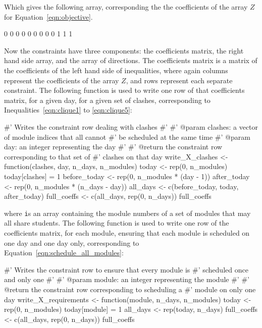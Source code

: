 Which gives the following array, corresponding the the coefficients of the array $Z$ for Equation~\ref{eqn:objective}.

\begin{Rout}
[1] 0 0 0 0 0 0 0 0 0 1 1 1
\end{Rout}

Now the constraints have three components: the coefficients matrix, the right hand side array, and the array of directions.
The coefficients matrix is a matrix of the coefficients of the left hand side of inequalities, where again columns represent the coefficients of the array $Z$, and rows represent each separate constraint.
The following function is used to write one row of that coefficients matrix, for a given day, for a given set of clashes, corresponding to Inequalities~\ref{eqn:clique1} to \ref{eqn:clique5}:

\begin{Rin}
#' Writes the constraint row dealing with clashes
#'
#' @param clashes: a vector of module indices that all cannot
#'                 be scheduled at the same time
#' @param day: an integer representing the day
#'
#' @return the constraint row corresponding to that set of
#'         clashes on that day
write_X_clashes <- function(clashes, day, n_days, n_modules){
  today <- rep(0, n_modules)
  today[clashes] = 1
  before_today <- rep(0, n_modules * (day - 1))
  after_today <- rep(0, n_modules * (n_days - day))
  all_days <- c(before_today, today, after_today)
  full_coeffs <- c(all_days, rep(0, n_days))
  full_coeffs
}
\end{Rin}

where \texttt is an array containing the module numbers of a set of modules that may all share students.
The following function is used to write one row of the coefficients matrix, for each module, ensuring that each module is scheduled on one day and one day only, corresponding to Equation~\ref{eqn:schedule_all_modules}:

\begin{Rin}
#' Writes the constraint row to ensure that every module is
#' scheduled once and only one
#'
#' @param module: an integer representing the module
#'
#' @return the constraint row corresponding to scheduling a
#'         module on only one day
write_X_requirements <- function(module, n_days, n_modules){
  today <- rep(0, n_modules)
  today[module] = 1
  all_days <- rep(today, n_days)
  full_coeffs <- c(all_days, rep(0, n_days))
  full_coeffs
}
\end{Rin}

